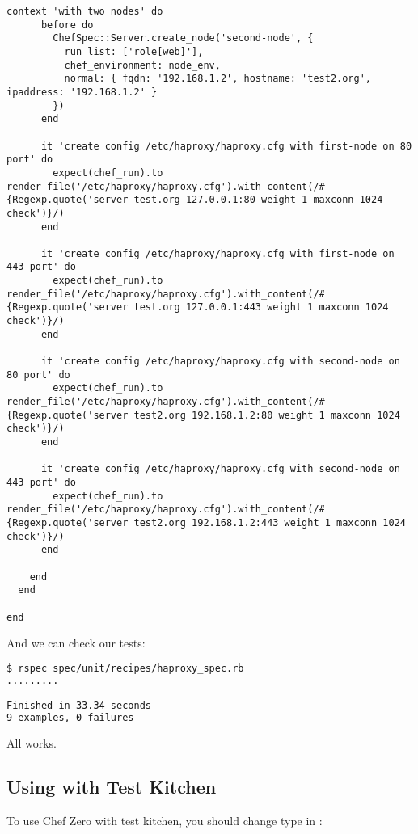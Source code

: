 \begin{lstlisting}[label=lst:testing-chef-zero15]
    context 'with two nodes' do
      before do
        ChefSpec::Server.create_node('second-node', {
          run_list: ['role[web]'],
          chef_environment: node_env,
          normal: { fqdn: '192.168.1.2', hostname: 'test2.org', ipaddress: '192.168.1.2' }
        })
      end

      it 'create config /etc/haproxy/haproxy.cfg with first-node on 80 port' do
        expect(chef_run).to render_file('/etc/haproxy/haproxy.cfg').with_content(/#{Regexp.quote('server test.org 127.0.0.1:80 weight 1 maxconn 1024 check')}/)
      end

      it 'create config /etc/haproxy/haproxy.cfg with first-node on 443 port' do
        expect(chef_run).to render_file('/etc/haproxy/haproxy.cfg').with_content(/#{Regexp.quote('server test.org 127.0.0.1:443 weight 1 maxconn 1024 check')}/)
      end

      it 'create config /etc/haproxy/haproxy.cfg with second-node on 80 port' do
        expect(chef_run).to render_file('/etc/haproxy/haproxy.cfg').with_content(/#{Regexp.quote('server test2.org 192.168.1.2:80 weight 1 maxconn 1024 check')}/)
      end

      it 'create config /etc/haproxy/haproxy.cfg with second-node on 443 port' do
        expect(chef_run).to render_file('/etc/haproxy/haproxy.cfg').with_content(/#{Regexp.quote('server test2.org 192.168.1.2:443 weight 1 maxconn 1024 check')}/)
      end

    end
  end

end
\end{lstlisting}

And we can check our tests:

\begin{lstlisting}[language=Bash,label=lst:testing-chef-zero16]
$ rspec spec/unit/recipes/haproxy_spec.rb
.........

Finished in 33.34 seconds
9 examples, 0 failures
\end{lstlisting}

All works.

\subsection{Using with Test Kitchen}

To use Chef Zero with test kitchen, you should change  type in :

